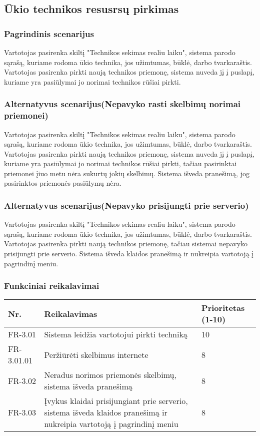 \documentclass[oneside]{VUMIFPSkursinis}
\begin{document}
\subsection{Ūkio technikos resusrsų pirkimas}
\subsubsection{Pagrindinis scenarijus}
	Vartotojas pasirenka skiltį "Technikos sekimas realiu laiku", sistema parodo sąrašą, kuriame rodoma ūkio technika, jos užimtumas, būklė, darbo tvarkaraštis. Vartotojas pasirenka pirkti naują technikos priemonę, sistema nuveda jį į puslapį, kuriame yra pasiūlymai jo norimai technikos rūšiai pirkti.
\subsubsection{Alternatyvus scenarijus(Nepavyko rasti skelbimų norimai priemonei)}
	Vartotojas pasirenka skiltį "Technikos sekimas realiu laiku", sistema parodo sąrašą, kuriame rodoma ūkio technika, jos užimtumas, būklė, darbo tvarkaraštis. Vartotojas pasirenka pirkti naują technikos priemonę, sistema nuveda jį į puslapį, kuriame yra pasiūlymai jo norimai technikos rūšiai pirkti, tačiau pasirinktai priemonei įiuo metu nėra sukurtų jokių skelbimų. Sistema išveda pranešimą, jog pasirinktos priemonės pasiūlymų nėra.
\subsubsection{Alternatyvus scenarijus(Nepavyko prisijungti prie serverio)}
	Vartotojas pasirenka skiltį "Technikos sekimas realiu laiku", sistema parodo sąrašą, kuriame rodoma ūkio technika, jos užimtumas, būklė, darbo tvarkaraštis. Vartotojas pasirenka pirkti naują technikos priemonę, tačiau sistemai nepavyko prisijungti prie serverio. Sistema išveda klaidos pranešimą ir nukreipia vartotoją į pagrindinį meniu.
\subsubsection{Funkciniai reikalavimai}
\begin{table}[htbp]
	\begin{tabularx}{1\textwidth}{ |P{2.5cm}|X|P{3cm }| }  \hline
           	Nr. & Reikalavimas &  Prioritetas (1-10)  \\   \hline 
         		FR-3.01 & Sistema leidžia vartotojui pirkti techniką & 10  \\   \hline
		FR-3.01.01 & Peržiūrėti skelbimus internete & 8 \\ \hline
        		FR-3.02 & Neradus norimos priemonės skelbimų, sistema išveda pranešimą & 8   \\   \hline
			FR-3.03 & Įvykus klaidai prisijungiant prie serverio, sistema išveda klaidos pranešimą ir nukreipia vartotoją į pagrindinį meniu & 8 \\ \hline
	\end{tabularx}
\end{table}
\end{document}
